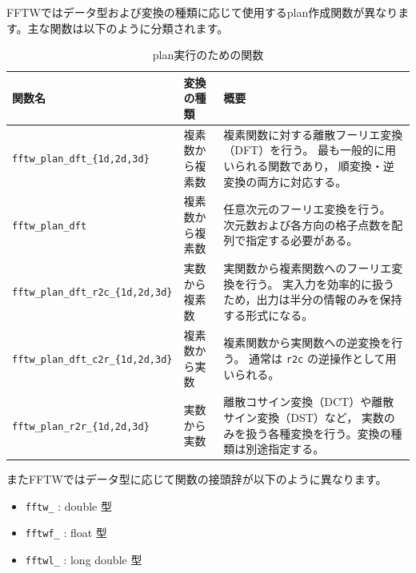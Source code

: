 \documentclass[12pt]{jreport}
\begin{document}

FFTWではデータ型および変換の種類に応じて使用するplan作成関数が異なります。主な関数は以下のように分類されます。

\begin{table}[H]
\centering
\caption{plan実行のための関数}
\renewcommand{\arraystretch}{1.3}

\begin{tabularx}{\textwidth}{|l|l|X|}
\hline
\rowcolor{tableblue!20}
\textbf{関数名} & \textbf{変換の種類} & \textbf{概要} \\
\hline

\texttt{fftw\_plan\_dft\_\{1d,2d,3d\}} &
複素数から複素数 &
複素関数に対する離散フーリエ変換（DFT）を行う。
最も一般的に用いられる関数であり，
順変換・逆変換の両方に対応する。 \\
\hline

\texttt{fftw\_plan\_dft} &
複素数から複素数 &
任意次元のフーリエ変換を行う。
次元数および各方向の格子点数を配列で指定する必要がある。 \\
\hline

\texttt{fftw\_plan\_dft\_r2c\_\{1d,2d,3d\}} &
実数から複素数 &
実関数から複素関数へのフーリエ変換を行う。
実入力を効率的に扱うため，出力は半分の情報のみを保持する形式になる。 \\
\hline

\texttt{fftw\_plan\_dft\_c2r\_\{1d,2d,3d\}} &
複素数から実数 &
複素関数から実関数への逆変換を行う。
通常は \texttt{r2c} の逆操作として用いられる。 \\
\hline

\texttt{fftw\_plan\_r2r\_\{1d,2d,3d\}} &
実数から実数 &
離散コサイン変換（DCT）や離散サイン変換（DST）など，
実数のみを扱う各種変換を行う。変換の種類は別途指定する。 \\
\hline

\end{tabularx}
\end{table}

またFFTWではデータ型に応じて関数の接頭辞が以下のように異なります。

\begin{itemize}
  \item \texttt{fftw\_} : double 型
  \item \texttt{fftwf\_} : float 型
  \item \texttt{fftwl\_} : long double 型
\end{itemize}
\end{document}
